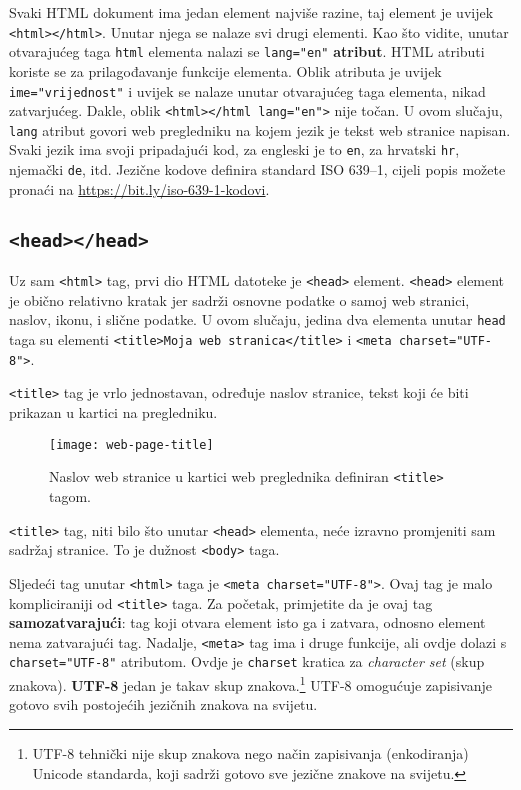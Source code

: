 Svaki HTML dokument ima jedan element najviše razine, taj element je uvijek \lstinline!<html></html>!.
Unutar njega se nalaze svi drugi elementi.
Kao što vidite, unutar otvarajućeg taga \lstinline!html! elementa nalazi se \lstinline!lang="en"! \textbf{atribut}.
HTML atributi koriste se za prilagođavanje funkcije elementa.
Oblik atributa je uvijek \lstinline!ime="vrijednost"! i uvijek se nalaze unutar otvarajućeg taga elementa, nikad zatvarjućeg.
Dakle, oblik \lstinline!<html></html lang="en">! nije točan.
U ovom slučaju, \lstinline!lang! atribut govori web pregledniku na kojem jezik je tekst web stranice napisan.
Svaki jezik ima svoji pripadajući kod, za engleski je to \lstinline!en!, za hrvatski \lstinline!hr!, njemački \lstinline!de!, itd.
Jezične kodove definira standard ISO 639--1, cijeli popis možete pronaći na \href{https://bit.ly/iso-639-1-kodovi}{https://bit.ly/iso-639-1-kodovi}.

\subsection{\texttt{<head></head>}}\label{subsec:head}

Uz sam \lstinline!<html>! tag, prvi dio HTML datoteke je \lstinline!<head>! element.
\lstinline!<head>! element je obično relativno kratak jer sadrži osnovne podatke o samoj web stranici, naslov, ikonu, i slične podatke.
U ovom slučaju, jedina dva elementa unutar \lstinline!head! taga su elementi \lstinline!<title>Moja web stranica</title>! i \lstinline!<meta charset="UTF-8">!.

\lstinline!<title>! tag je vrlo jednostavan, određuje naslov stranice, tekst koji će biti prikazan u kartici na pregledniku.
\begin{figure}[h]
    \texttt{[image: web-page-title]}
    \caption{Naslov web stranice u kartici web preglednika definiran \lstinline!<title>! tagom.}
\end{figure}

\lstinline!<title>! tag, niti bilo što unutar \lstinline!<head>! elementa, neće izravno promjeniti sam sadržaj stranice.
To je dužnost \lstinline!<body>! taga.

Sljedeći tag unutar \lstinline!<html>! taga je \lstinline!<meta charset="UTF-8">!.
Ovaj tag je malo kompliciraniji od \lstinline!<title>! taga.
Za početak, primjetite da je ovaj tag \textbf{samozatvarajući}: tag koji otvara element isto ga i zatvara, odnosno element nema zatvarajući tag.
Nadalje, \lstinline!<meta>! tag ima i druge funkcije, ali ovdje dolazi s \lstinline!charset="UTF-8"! atributom.
Ovdje je \lstinline!charset! kratica za \textit{character set} (skup znakova).
\textbf{UTF-8} jedan je takav skup znakova.\footnote{UTF-8 tehnički nije skup znakova nego način zapisivanja (enkodiranja) Unicode standarda, koji sadrži gotovo sve jezične znakove na svijetu.}
UTF-8 omogućuje zapisivanje gotovo svih postojećih jezičnih znakova na svijetu.


